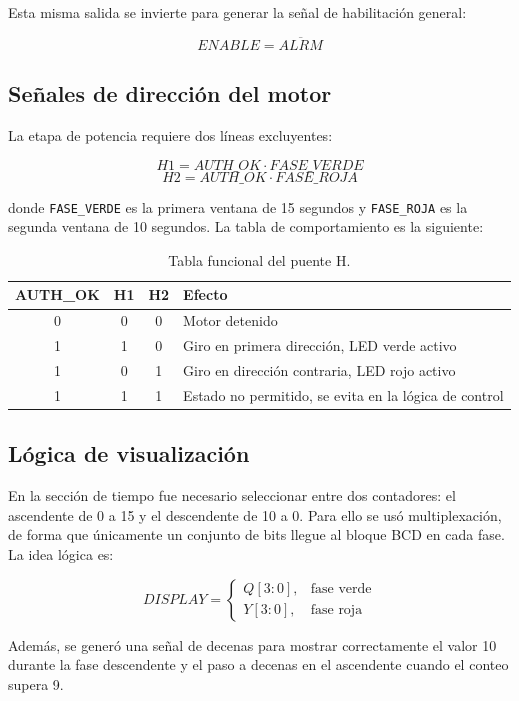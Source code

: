 \documentclass[12pt,a4paper]{article}
\begin{document}
Esta misma salida se invierte para generar la señal de habilitación general:

\[
ENABLE = \overline{ALRM}
\]

\subsection{Señales de dirección del motor}
La etapa de potencia requiere dos líneas excluyentes:

\[
H1 = AUTH\_OK \cdot FASE\_VERDE
\]
\[
H2 = AUTH\_OK \cdot FASE\_ROJA
\]

donde \texttt{FASE\_VERDE} es la primera ventana de 15 segundos y \texttt{FASE\_ROJA} es la segunda ventana de 10 segundos. La tabla de comportamiento es la siguiente:

\begin{table}[H]
    \centering
    \caption{Tabla funcional del puente H.}
    \begin{tabular}{c c c p{5.4cm}}
        \toprule
        \textbf{AUTH\_OK} & \textbf{H1} & \textbf{H2} & \textbf{Efecto} \\
        \midrule
        0 & 0 & 0 & Motor detenido \\
        1 & 1 & 0 & Giro en primera dirección, LED verde activo \\
        1 & 0 & 1 & Giro en dirección contraria, LED rojo activo \\
        1 & 1 & 1 & Estado no permitido, se evita en la lógica de control \\
        \bottomrule
    \end{tabular}
\end{table}

\subsection{Lógica de visualización}
En la sección de tiempo fue necesario seleccionar entre dos contadores: el ascendente de 0 a 15 y el descendente de 10 a 0. Para ello se usó multiplexación, de forma que únicamente un conjunto de bits llegue al bloque BCD en cada fase. La idea lógica es:

\[
DISPLAY = \begin{cases}
Q[3:0], & \text{fase verde} \\
Y[3:0], & \text{fase roja}
\end{cases}
\]

Además, se generó una señal de decenas para mostrar correctamente el valor 10 durante la fase descendente y el paso a decenas en el ascendente cuando el conteo supera 9.
\end{document}
